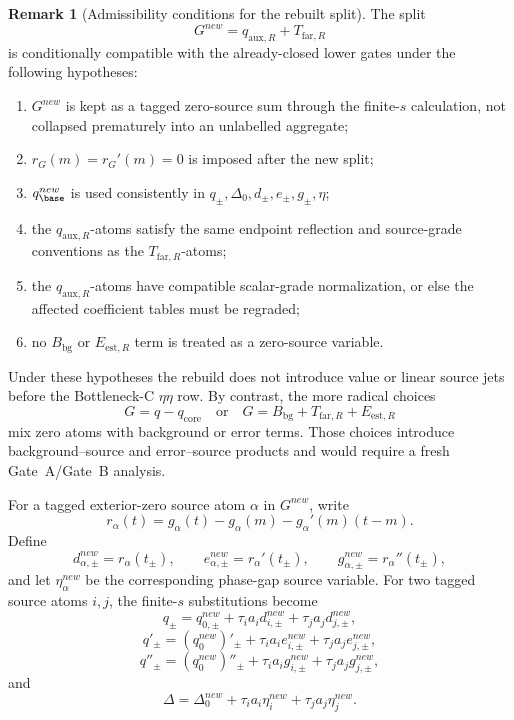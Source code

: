 \documentclass[11pt,a4paper]{amsart}
\def\new{new}%
\theoremstyle{plain}
\theoremstyle{definition}
\newtheorem{remark}[theorem]{Remark}
\newcommand{\new}{\mathrm{new}}
\begin{document}
\begin{remark}[Admissibility conditions for the rebuilt split]
\label{rem:rebuilt-source-split-admissibility-conditions}
The split
\[
G^{\new}=q_{\mathrm{aux},R}+T_{\mathrm{far},R}
\]
is conditionally compatible with the already-closed lower gates under the
following hypotheses:
\begin{enumerate}
\item \(G^{\new}\) is kept as a tagged zero-source sum through the finite-\(s\)
calculation, not collapsed prematurely into an unlabelled aggregate;
\item \(r_G(m)=r_G'(m)=0\) is imposed after the new split;
\item \(q_{\base}^{\new}\) is used consistently in \(q_\pm,\Delta_0,d_\pm,
e_\pm,g_\pm,\eta\);
\item the \(q_{\mathrm{aux},R}\)-atoms satisfy the same endpoint reflection and
source-grade conventions as the \(T_{\mathrm{far},R}\)-atoms;
\item the \(q_{\mathrm{aux},R}\)-atoms have compatible scalar-grade
normalization, or else the affected coefficient tables must be regraded;
\item no \(B_{\mathrm{bg}}\) or \(E_{\mathrm{est},R}\) term is treated as a
zero-source variable.
\end{enumerate}
Under these hypotheses the rebuild does not introduce value or linear source
jets before the Bottleneck-C \(\eta\eta\) row.  By contrast, the more radical
choices
\[
G=q-q_{\mathrm{core}}
\quad\text{or}\quad
G=B_{\mathrm{bg}}+T_{\mathrm{far},R}+E_{\mathrm{est},R}
\]
mix zero atoms with background or error terms.  Those choices introduce
background--source and error--source products and would require a fresh
Gate~A/Gate~B analysis.
\end{remark}

For a tagged exterior-zero source atom \(\alpha\) in \(G^{\new}\), write
\[
r_\alpha(t)
=
g_\alpha(t)-g_\alpha(m)-g_\alpha'(m)(t-m).
\]
Define
\[
d_{\alpha,\pm}^{\new}=r_\alpha(t_\pm),
\qquad
e_{\alpha,\pm}^{\new}=r_\alpha'(t_\pm),
\qquad
g_{\alpha,\pm}^{\new}=r_\alpha''(t_\pm),
\]
and let \(\eta_\alpha^{\new}\) be the corresponding phase-gap source variable.
For two tagged source atoms \(i,j\), the finite-\(s\) substitutions become
\[
q_\pm
=
q_{0,\pm}^{\new}
+
\tau_i a_i d_{i,\pm}^{\new}
+
\tau_j a_j d_{j,\pm}^{\new},
\]
\[
q'_\pm
=
(q_0^{\new})'_\pm
+
\tau_i a_i e_{i,\pm}^{\new}
+
\tau_j a_j e_{j,\pm}^{\new},
\]
\[
q''_\pm
=
(q_0^{\new})''_\pm
+
\tau_i a_i g_{i,\pm}^{\new}
+
\tau_j a_j g_{j,\pm}^{\new},
\]
and
\[
\Delta
=
\Delta_0^{\new}
+
\tau_i a_i\eta_i^{\new}
+
\tau_j a_j\eta_j^{\new}.
\]
\end{document}
